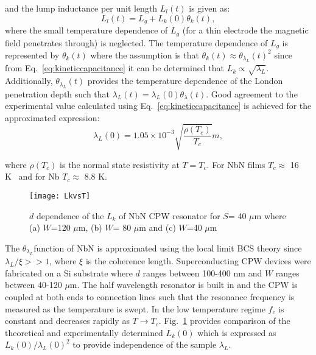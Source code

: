\noindent and the lump inductance per unit length $L_{l}(t)$ is given as: 
\begin{equation}
\label{eq:templumpinductance}
L_{l}(t)=L_{g}+L_{k}(0) \theta_{k}(t),
\end{equation}
\noindent where the small temperature dependence of $L_{g}$ (for a thin electrode the magnetic field penetrates through) is neglected. The temperature dependence of $L_{g}$ is represented by $\theta_{k}(t)$ where the assumption is that  $\theta_{k} (t) \approx \theta_{\lambda_{L}} (t) ^{2}$ since from Eq.~\ref{eq:kineticcapacitance} it can be determined that $L_{k} \propto \sqrt{\lambda_{L}}$. Additionally, $\theta_{\lambda_{L}} (t)$ provides the temperature dependence of the London penetration depth such that $\lambda_{L}(t) = \lambda_{L}(0) \theta_{\lambda}(t)$. Good agreement to the experimental value calculated using Eq.~\ref{eq:kineticcapacitance} is achieved for the approximated expression:
\begin{equation}
\label{eq:tempLondonpentration}
\lambda_{L}(0) = 1.05 \times 10^{-3}\sqrt{\frac{\rho(T_{c})}{T_{c}}}m,
\end{equation} 

\noindent where $\rho(T_{c})$ is the normal state resistivity at $T=T_{c}$. For NbN films $T_{c} \approx$ 16 K~\citep{1347-4065-33-10R-5708} and for Nb $T_{c} \approx$ 8.8 K. 

\begin{figure}[H]
\centering
\texttt{[image: LkvsT]}
\caption{\label{fig:LkvsT} $d$ dependence of the $L_{k}$ of NbN CPW resonator for $S$= 40 $\mu$m where (a) $W$=120 $\mu$m, (b) $W$= 80 $\mu$m and (c) $W$=40 $\mu$m \citep{1347-4065-33-10R-5708}}
\end{figure}

The $\theta_{\lambda_{L}}$function of NbN is approximated using the local limit BCS theory since $\lambda_{L}/\xi>> 1 $, where $\xi$ is the coherence length. Superconducting CPW devices were fabricated on a Si substrate where $d$ ranges between 100-400 nm and $W$ ranges between 40-120 $\mu$m. The half wavelength resonator is built in and the CPW is coupled at both ends to connection lines such that the resonance frequency is measured as the temperature is swept. In the low temperature regime $f_{c}$ is constant and decreases rapidly as $T \rightarrow T_{c}$.  Fig.~\ref{fig:LkvsT} provides comparison of the theoretical and experimentally determined $L_{k}(0)$ which is expressed as $L_{k}(0)/\lambda_{L}(0)^{2}$ to provide independence of the sample $\lambda_{L}$. 





